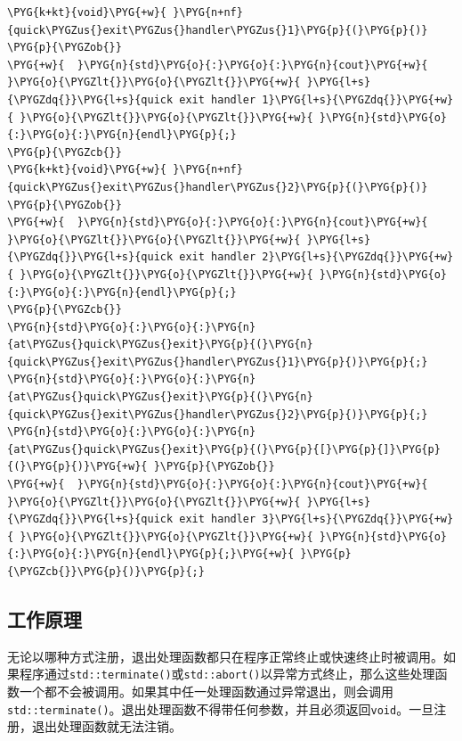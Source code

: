 \begin{itemize}

\begin{codeblockbg}
\begin{Verbatim}[commandchars=\\\{\},breaklines=true,breakanywhere=true,fontsize=\codefont,xleftmargin=17bp]
\PYG{k+kt}{void}\PYG{+w}{ }\PYG{n+nf}{quick\PYGZus{}exit\PYGZus{}handler\PYGZus{}1}\PYG{p}{(}\PYG{p}{)}
\PYG{p}{\PYGZob{}}
\PYG{+w}{  }\PYG{n}{std}\PYG{o}{:}\PYG{o}{:}\PYG{n}{cout}\PYG{+w}{ }\PYG{o}{\PYGZlt{}}\PYG{o}{\PYGZlt{}}\PYG{+w}{ }\PYG{l+s}{\PYGZdq{}}\PYG{l+s}{quick exit handler 1}\PYG{l+s}{\PYGZdq{}}\PYG{+w}{ }\PYG{o}{\PYGZlt{}}\PYG{o}{\PYGZlt{}}\PYG{+w}{ }\PYG{n}{std}\PYG{o}{:}\PYG{o}{:}\PYG{n}{endl}\PYG{p}{;}
\PYG{p}{\PYGZcb{}}
\PYG{k+kt}{void}\PYG{+w}{ }\PYG{n+nf}{quick\PYGZus{}exit\PYGZus{}handler\PYGZus{}2}\PYG{p}{(}\PYG{p}{)}
\PYG{p}{\PYGZob{}}
\PYG{+w}{  }\PYG{n}{std}\PYG{o}{:}\PYG{o}{:}\PYG{n}{cout}\PYG{+w}{ }\PYG{o}{\PYGZlt{}}\PYG{o}{\PYGZlt{}}\PYG{+w}{ }\PYG{l+s}{\PYGZdq{}}\PYG{l+s}{quick exit handler 2}\PYG{l+s}{\PYGZdq{}}\PYG{+w}{ }\PYG{o}{\PYGZlt{}}\PYG{o}{\PYGZlt{}}\PYG{+w}{ }\PYG{n}{std}\PYG{o}{:}\PYG{o}{:}\PYG{n}{endl}\PYG{p}{;}
\PYG{p}{\PYGZcb{}}
\PYG{n}{std}\PYG{o}{:}\PYG{o}{:}\PYG{n}{at\PYGZus{}quick\PYGZus{}exit}\PYG{p}{(}\PYG{n}{quick\PYGZus{}exit\PYGZus{}handler\PYGZus{}1}\PYG{p}{)}\PYG{p}{;}
\PYG{n}{std}\PYG{o}{:}\PYG{o}{:}\PYG{n}{at\PYGZus{}quick\PYGZus{}exit}\PYG{p}{(}\PYG{n}{quick\PYGZus{}exit\PYGZus{}handler\PYGZus{}2}\PYG{p}{)}\PYG{p}{;}
\PYG{n}{std}\PYG{o}{:}\PYG{o}{:}\PYG{n}{at\PYGZus{}quick\PYGZus{}exit}\PYG{p}{(}\PYG{p}{[}\PYG{p}{]}\PYG{p}{(}\PYG{p}{)}\PYG{+w}{ }\PYG{p}{\PYGZob{}}
\PYG{+w}{  }\PYG{n}{std}\PYG{o}{:}\PYG{o}{:}\PYG{n}{cout}\PYG{+w}{ }\PYG{o}{\PYGZlt{}}\PYG{o}{\PYGZlt{}}\PYG{+w}{ }\PYG{l+s}{\PYGZdq{}}\PYG{l+s}{quick exit handler 3}\PYG{l+s}{\PYGZdq{}}\PYG{+w}{ }\PYG{o}{\PYGZlt{}}\PYG{o}{\PYGZlt{}}\PYG{+w}{ }\PYG{n}{std}\PYG{o}{:}\PYG{o}{:}\PYG{n}{endl}\PYG{p}{;}\PYG{+w}{ }\PYG{p}{\PYGZcb{}}\PYG{p}{)}\PYG{p}{;}
\end{Verbatim}
\end{codeblockbg}

\end{itemize}



\subsection{工作原理}



无论以哪种方式注册，退出处理函数都只在程序正常终止或快速终止时被调用。如果程序通过\texttt{std::\allowbreak{}terminate()}或\texttt{std::\allowbreak{}abort()}以异常方式终止，那么这些处理函数一个都不会被调用。如果其中任一处理函数通过异常退出，则会调用\texttt{std::\allowbreak{}terminate()}。退出处理函数不得带任何参数，并且必须返回\texttt{void}。一旦注册，退出处理函数就无法注销。


